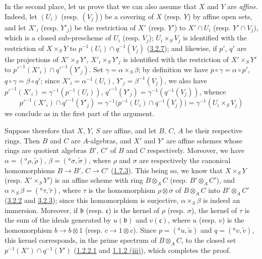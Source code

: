 In the second place, let us prove that we can also assume that $X$ and $Y$
are \emph{affine}. Indeed, let $(U_i)$ (resp. $(V_j)$) be a covering of $X$
(resp. $Y$) by affine open sets, and let $X'_i$ (resp. $Y'_j$) be the
restriction of $X'$ (resp. $Y'$) to $X'\cap U_i$ (resp. $Y'\cap V_j$), which
is a closed sub-prescheme of $U_i$ (resp. $V_j$); $U_i\times_S V_j$ is
identified with the restriction of $X\times_S Y$ to
$p^{-1}(U_i)\cap q^{-1}(V_j)$ (\hyperref[I.3.2.7]{3.2.7}); and likewise, if
$p'$, $q'$ are the projections of $X'\times_S Y'$,
$X'_i\times_S Y'_j$ is identified with the restriction of $X'\times_S Y'$ to
${p'}^{-1}(X'_i)\cap{q'}^{-1}(Y'_j)$. Set
$\gamma=\alpha\times_S\beta$; by definition we have
$p\circ\gamma=\alpha\circ p'$, $q\circ\gamma=\beta\circ q'$; since
$X'_i=\alpha^{-1}(U_i)$, $Y'_j=\beta^{-1}(V_j)$, we also have
${p'}^{-1}(X'_i)=\gamma^{-1}(p^{-1}(U_i))$,
${q'}^{-1}(Y'_j)=\gamma^{-1}(q^{-1}(V_j))$, whence
\[
  {p'}^{-1}(X'_i)\cap{q'}^{-1}(Y'_j)
  =\gamma^{-1}\bigl(p^{-1}(U_i)\cap q^{-1}(V_j)\bigr)
  =\gamma^{-1}(U_i\times_S V_j)
\]
we conclude as in the first part of the argument.

Suppose therefore that $X$, $Y$, $S$ are affine, and let $B$, $C$, $A$ be their
respective rings. Then $B$ and $C$ are $A$-algebras, and $X'$ and $Y'$ are
affine schemes whose rings are quotient algebras $B'$, $C'$ of $B$ and
$C$ respectively. Moreover, we have
$\alpha=({}^a\rho,\widetilde{\rho})$, $\beta=({}^a\sigma,\widetilde{\sigma})$,
where $\rho$ and $\sigma$ are respectively the canonical homomorphisms
$B\to B'$, $C\to C'$ (\hyperref[I.1.7.3]{1.7.3}). This being so, we know
that $X\times_S Y$ (resp. $X'\times_S Y'$) is an affine scheme with ring
$B\otimes_A C$ (resp. $B'\otimes_A C'$), and
$\alpha\times_S\beta=({}^a\tau,\widetilde{\tau})$, where $\tau$ is
the homomorphism $\rho\otimes\sigma$ of $B\otimes_A C$ into
$B'\otimes_A C'$ (\hyperref[I.3.2.2]{3.2.2} and
\hyperref[I.3.2.3]{3.2.3}); since this homomorphism is surjective,
$\alpha\times_S\beta$ is indeed an immersion. Moreover, if $\mathfrak{b}$
(resp. $\mathfrak{c}$) is the kernel of $\rho$ (resp. $\sigma$), the kernel of
$\tau$ is the sum of the ideals generated by $u(\mathfrak{b})$ and $v(\mathfrak{c})$, where $u$ (resp. $v$) is
the homomorphism $b\to b\otimes1$ (resp. $c\to1\otimes c$). Since
$p=({}^a u,\widetilde{u})$ and $q=({}^a v,\widetilde{v})$, this kernel
corresponds, in the prime spectrum of $B\otimes_A C$, to the closed set
$p^{-1}(X')\cap q^{-1}(Y')$ (\hyperref[I.1.2.2.1]{1.2.2.1} and
\hyperref[I.1.1.2]{1.1.2 (iii)}), which completes the proof.

